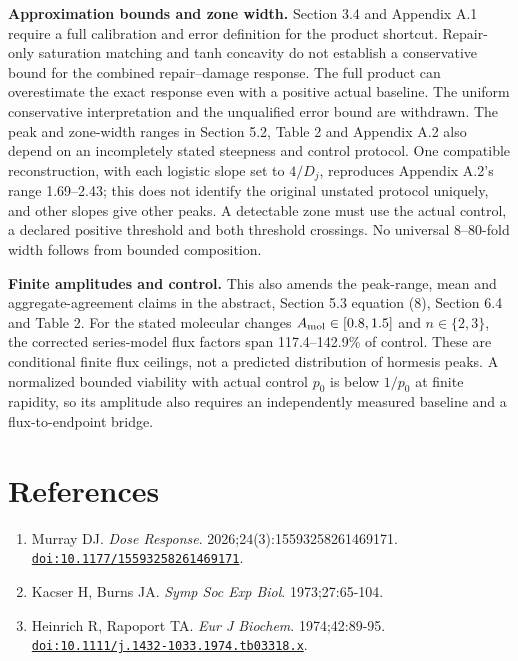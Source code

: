 \documentclass[
  11pt,
  a4paper,
]{article}
\providecommand{\tightlist}{%
  \setlength{\itemsep}{0pt}\setlength{\parskip}{0pt}}
\begin{document}
\textbf{Approximation bounds and zone width.} Section 3.4 and Appendix A.1 require a full calibration and error definition for the product shortcut. Repair-only saturation matching and tanh concavity do not establish a conservative bound for the combined repair--damage response. The full product can overestimate the exact response even with a positive actual baseline. The uniform conservative interpretation and the unqualified error bound are withdrawn. The peak and zone-width ranges in Section 5.2, Table 2 and Appendix A.2 also depend on an incompletely stated steepness and control protocol. One compatible reconstruction, with each logistic slope set to \(4/D_j\), reproduces Appendix A.2's range 1.69--2.43; this does not identify the original unstated protocol uniquely, and other slopes give other peaks. A detectable zone must use the actual control, a declared positive threshold and both threshold crossings. No universal 8--80-fold width follows from bounded composition.

\textbf{Finite amplitudes and control.} This also amends the peak-range, mean and aggregate-agreement claims in the abstract, Section 5.3 equation (8), Section 6.4 and Table 2. For the stated molecular changes \(A_{\rm mol}\in[0.8,1.5]\) and \(n\in\{2,3\}\), the corrected series-model flux factors span 117.4--142.9\% of control. These are conditional finite flux ceilings, not a predicted distribution of hormesis peaks. A normalized bounded viability with actual control \(p_0\) is below \(1/p_0\) at finite rapidity, so its amplitude also requires an independently measured baseline and a flux-to-endpoint bridge.

\section{References}\label{references}

\begin{enumerate}
\def\labelenumi{\arabic{enumi}.}
\tightlist
\item
  Murray DJ. \emph{Dose Response}. 2026;24(3):15593258261469171. \href{https://doi.org/10.1177/15593258261469171}{\nolinkurl{doi:10.1177/15593258261469171}}.
\item
  Kacser H, Burns JA. \emph{Symp Soc Exp Biol}. 1973;27:65-104.
\item
  Heinrich R, Rapoport TA. \emph{Eur J Biochem}. 1974;42:89-95. \href{https://doi.org/10.1111/j.1432-1033.1974.tb03318.x}{\nolinkurl{doi:10.1111/j.1432-1033.1974.tb03318.x}}.
\end{enumerate}
\end{document}
